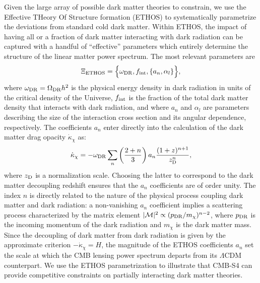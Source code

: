 Given the large array of possible dark matter theories to constrain, we use the Effective THeory Of Structure formation (ETHOS) \cite{Cyr-Racine:2015ihg} to systematically parametrize the deviations from standard cold dark matter. Within ETHOS, the impact of having all or a fraction of dark matter interacting with dark radiation can be captured with a handful of ``effective'' parameters which entirely determine the structure of the linear matter power spectrum. The most relevant parameters are \cite{Cyr-Racine:2015ihg}
%
\begin{equation}
\Xi_{\rm ETHOS} = \Big\{\omega_{\rm DR},f_{\rm int}, \{a_n,\alpha_l\} \Big\},
\end{equation}
%
where $\omega_{\rm DR} = \Omega_{\rm DR}h^2$ is the physical energy density in dark radiation in units of the critical density of the Universe, $f_{\rm int}$ is the fraction of the total dark matter density that interacts with dark radiation, and where $a_n$ and $\alpha_l$ are parameters describing the size of the interaction cross section and its angular dependence, respectively. The coefficients $a_n$ enter directly into the calculation of the dark matter drag opacity $\dot{\kappa}_\chi$ as:
%
\begin{equation}
\dot{\kappa}_\chi =- \omega_{\rm DR} \sum_n \left(\frac{2+n}{3}\right)a_n \frac{(1+z)^{n+1}}{z_{\rm D}^n},
\end{equation}
%
where $z_{\rm D}$ is a normalization scale. Choosing the latter to correspond to the dark matter decoupling redshift ensures that the $a_n$ coefficients are of order unity. The index $n$ is directly related to the nature of the physical process coupling dark matter and dark radiation: a non-vanishing $a_n$ coefficient implies a scattering process characterized by the matrix element $|\mathcal{M}|^2 \propto (p_{\rm DR}/m_\chi)^{n-2}$, where $p_{\rm DR}$ is the incoming momentum of the dark radiation and $m_\chi$ is the dark matter mass. Since the decoupling of dark matter from dark radiation is given by the approximate criterion $-\dot{\kappa}_\chi = H$, the magnitude of the ETHOS coefficients $a_n$ set the scale at which the CMB lensing power spectrum departs from its $\Lambda$CDM counterpart.  We use the ETHOS parametrization to illustrate that CMB-S4 can provide competitive constraints on partially interacting dark matter theories.\\

